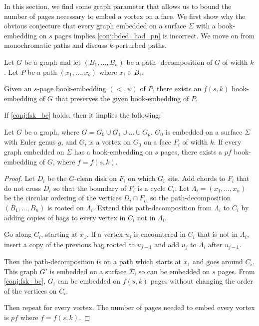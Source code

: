 
In this section, we find some graph parameter that allows us to bound the number of pages necessary to embed a vortex on a face. We first show why the obvious conjecture that every graph embedded on a surface $\Sigma$ with a book-embedding on $s$ pages implies \cref{conj:bded_had_pn} is incorrect. We move on from monochromatic paths and discuss $k$-perturbed paths. 

\begin{conjecture}\label{conj:fsk_be}
	Let $G$ be a graph and let $(B_1, \ldots, B_n)$ be a path- decomposition of $G$ of width $k$. Let $P$ be a path $(x_1, \ldots, x_b)$ where $x_i \in B_i$. 

	Given an $s$-page book-embedding $(<, \psi)$ of $P$, there exists an $f(s, k)$ book-embedding of $G$ that preserves the given book-embedding of $P$.
\end{conjecture}

If \cref{conj:fsk_be} holds, then it implies the following:

\begin{corollary}\label{corr:fsk_be}
	Let $G$ be a graph, where $G = G_0 \cup G_1 \cup \ldots \cup G_p$. $G_0$ is embedded on a surface $\Sigma$ with Euler genus $g$, and $G_i$ is a vortex on $G_0$ on a face $F_i$ of width $k$. If every graph embedded on $\Sigma$ has a book-embedding on $s$ pages, there exists a $p f$ book-embedding of $G$, where $f = f(s, k)$.
\end{corollary}

\begin{proof}
	Let $D_i$ be the $G$-clean disk on $F_i$ on which $G_i$ sits. Add chords to $F_i$ that do not cross $D_i$ so that the boundary of $F_i$ is a cycle $C_i$. Let $\Lambda_i= (x_1, \ldots, x_n)$ be the circular ordering of the vertices $D_i \cap F_i$, so the path-decomposition $(B_1, \ldots , B_n)$ is rooted on $\Lambda_i$. Extend this path-decomposition from $\Lambda_i$ to $C_i$ by adding copies of bags to every vertex in $C_i$ not in $\Lambda_i$.

	Go along $C_i$, starting at $x_1$. If a vertex $u_j$ is encountered in $C_i$ that is not in $\Lambda_i$, insert a copy of the previous bag rooted at $u_{j-1}$ and add $u_j$ to $\Lambda_i$ after $u_{j-1}$.
	
	Then the path-decomposition is on a path which starts at $x_1$ and goes around $C_i$.  
	This graph $G'$ is embedded on a surface $\Sigma$, so can be embedded on $s$ pages. From \cref{conj:fsk_be}, $G_i$ can be embedded on $f(s, k)$ pages without changing the order of the vertices on $C_i$.

	Then repeat for every vortex. The number of pages needed to embed every vortex is $p f$ where $f = f(s, k)$. 
\end{proof}

